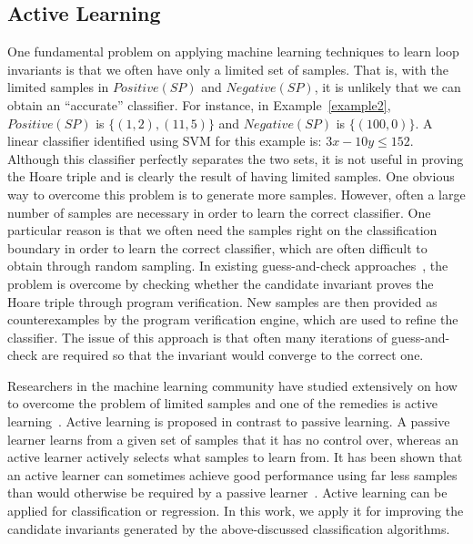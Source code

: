 \subsection{Active Learning} \label{active}
One fundamental problem on applying machine learning techniques to learn loop invariants is that we often have only a limited set of samples. That is, with the limited samples in $Positive(SP)$ and $Negative(SP)$, it is unlikely that we can obtain an ``accurate'' classifier. For instance, in Example~\ref{example2}, $Positive(SP)$ is $\{(1, 2),(11, 5)\}$ and $Negative(SP)$ is $\{(100, 0)\}$. A linear classifier identified using SVM for this example is: $3x-10y \leq 152$. Although this classifier perfectly separates the two sets, it is not useful in proving the Hoare triple and is clearly the result of having limited samples.
One obvious way to overcome this problem is to generate more samples. However, often a large number of samples are necessary in order to learn the correct classifier. One particular reason is that we often need the samples right on the classification boundary in order to learn the correct classifier, which are often difficult to obtain through random sampling. In existing guess-and-check approaches~\cite{sharma2012interpolants,sharma2013verification,DBLP:conf/esop/0001GHALN13,sharma2014invariant}, the problem is overcome by checking whether the candidate invariant proves the Hoare triple through program verification. New samples are then provided as counterexamples by the program verification engine, which are used to refine the classifier. The issue of this approach is that often many iterations of guess-and-check are required so that the invariant would converge to the correct one.

Researchers in the machine learning community have studied extensively on how to overcome the problem of limited samples and one of the remedies is active learning~\cite{DBLP:series/synthesis/2012Settles}.
Active learning is proposed in contrast to passive learning. A passive learner learns from a given set of samples that it has no control over, whereas an active learner actively selects what samples to learn from. It has been shown that an active learner can sometimes achieve good performance using far less samples than would otherwise be required by a passive learner~\cite{DBLP:conf/mm/TongC01,DBLP:journals/jmlr/TongK01}. Active learning can be applied for classification or regression. In this work, we apply it for improving the candidate invariants generated by the above-discussed classification algorithms.

